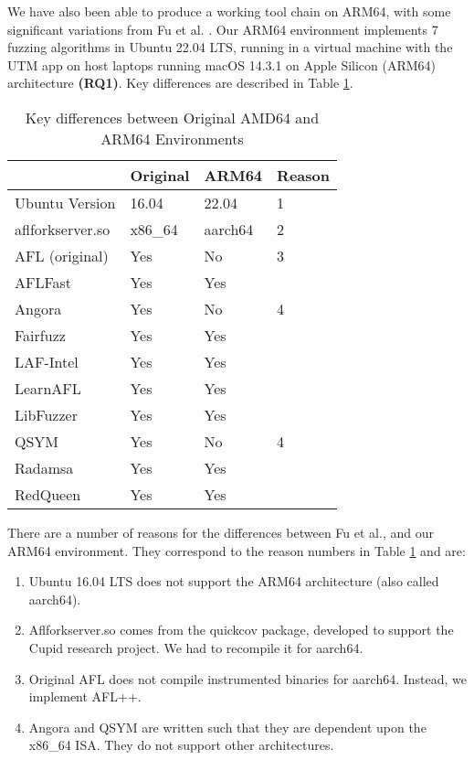 We have also been able to produce a working tool chain on ARM64, with some significant variations
from Fu et al. \cite{Fu}. Our ARM64 environment implements 7 fuzzing algorithms in
Ubuntu 22.04 LTS, running in a virtual machine with the UTM app on host laptops running
macOS 14.3.1 on Apple Silicon (ARM64) architecture \textbf{(RQ1)}. Key differences are
described in Table \ref{arm64-characteristics}.

\begin{table}[ht]
    \begin{tabular}{|l|l|l|l|}
        \hline
                        & Original\cite{Fu} & ARM64 & Reason \\
        \hline
        Ubuntu Version  & 16.04             & 22.04 & 1 \\
        \hline
        aflforkserver.so    & x86\_64           & aarch64 & 2 \\
        \hline
        AFL (original)  & Yes               & No & 3 \\
        \hline
        AFLFast         & Yes               & Yes & \\
        \hline
        Angora          & Yes               & No & 4 \\
        \hline
        Fairfuzz        & Yes               & Yes & \\
        \hline
        LAF-Intel       & Yes               & Yes & \\
        \hline
        LearnAFL        & Yes               & Yes & \\
        \hline
        LibFuzzer       & Yes               & Yes & \\
        \hline
        QSYM            & Yes               & No & 4 \\
        \hline
        Radamsa         & Yes               & Yes & \\
        \hline
        RedQueen        & Yes               & Yes & \\
        \hline
    \end{tabular}
    \caption{Key differences between Original AMD64 and ARM64 Environments}
    \label{arm64-characteristics}
\end{table}

There are a number of reasons for the differences between Fu et al., 
and our ARM64 environment. They correspond to the reason numbers in Table \ref{arm64-characteristics}
and are:
\begin{enumerate}
    \item Ubuntu 16.04 LTS does not support the ARM64 architecture (also called aarch64).
    \item Aflforkserver.so comes from the quickcov package, developed to support the Cupid
    research project\cite{guler2020cupid}. We had to recompile it for aarch64.
    \item Original AFL does not compile instrumented binaries for aarch64. Instead, we
    implement AFL++.
    \item Angora and QSYM are written such that they are dependent upon the x86\_64 ISA.
    They do not support other architectures.
\end{enumerate}

